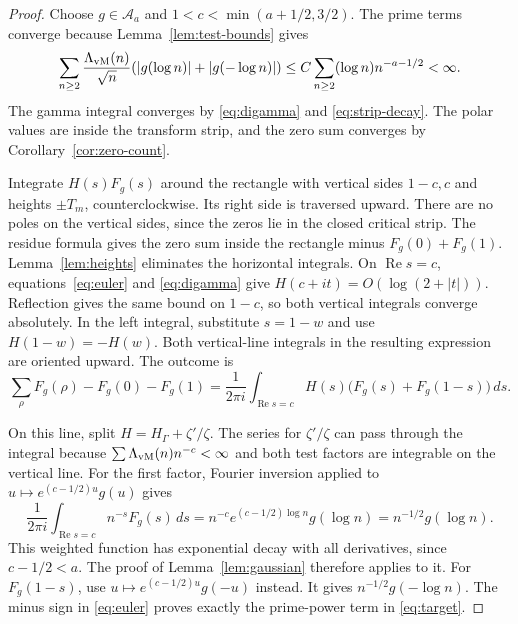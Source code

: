 \documentclass[11pt]{article}
\numberwithin{equation}{section}
\newcommand{\A}{\mathcal A}
\begin{document}
\begin{proof}
Choose $g\in\A_a$ and $1<c<\min(a+1/2,3/2)$.
The prime terms converge because Lemma~\ref{lem:test-bounds} gives
\[
 \sum_{n\geq2}\frac{\Lambda_{\rm vM}(n)}{\sqrt n}
                    (|g(\log n)|+|g(-\log n)|)
 \leq C\sum_{n\geq2}(\log n)n^{-a-1/2}<\infty.
\]
The gamma integral converges by \eqref{eq:digamma} and
\eqref{eq:strip-decay}.  The polar values are inside the transform strip,
and the zero sum converges by Corollary~\ref{cor:zero-count}.

Integrate $H(s)F_g(s)$ around the rectangle with vertical sides $1-c,c$
and heights $\pm T_m$, counterclockwise.  Its right side is traversed upward.
There are no poles on the vertical sides, since the zeros lie in the
closed critical strip.
The residue formula gives the zero sum inside the rectangle minus
$F_g(0)+F_g(1)$.
Lemma~\ref{lem:heights} eliminates the horizontal integrals.
On $\operatorname{Re}s=c$, equations~\eqref{eq:euler} and
\eqref{eq:digamma} give $H(c+it)=O(\log(2+|t|))$.
Reflection gives the same bound on $1-c$, so both vertical integrals
converge absolutely.
In the left integral, substitute $s=1-w$ and use $H(1-w)=-H(w)$.
Both vertical-line integrals in the resulting expression are oriented upward.
The outcome is
\begin{equation}
 \sum_\rho F_g(\rho)-F_g(0)-F_g(1)
 =\frac1{2\pi i}\int_{\operatorname{Re}s=c}
           H(s)\bigl(F_g(s)+F_g(1-s)\bigr)\,ds.
 \label{eq:spine-contour}
\end{equation}

On this line, split $H=H_\Gamma+\zeta'/\zeta$.
The series for $\zeta'/\zeta$ can pass through the integral because
$\sum\Lambda_{\rm vM}(n)n^{-c}<\infty$ and both test factors are integrable
on the vertical line.
For the first factor, Fourier inversion applied to
$u\mapsto e^{(c-1/2)u}g(u)$ gives
\begin{equation}
 \frac1{2\pi i}\int_{\operatorname{Re}s=c}n^{-s}F_g(s)\,ds
 =n^{-c}e^{(c-1/2)\log n}g(\log n)
 =n^{-1/2}g(\log n).
 \label{eq:prime-inversion}
\end{equation}
This weighted function has exponential decay with all derivatives, since
$c-1/2<a$.  The proof of Lemma~\ref{lem:gaussian} therefore applies to it.
For $F_g(1-s)$, use $u\mapsto e^{(c-1/2)u}g(-u)$ instead.
It gives $n^{-1/2}g(-\log n)$.
The minus sign in \eqref{eq:euler} proves exactly the prime-power term in
\eqref{eq:target}.


\end{proof}
\end{document}
